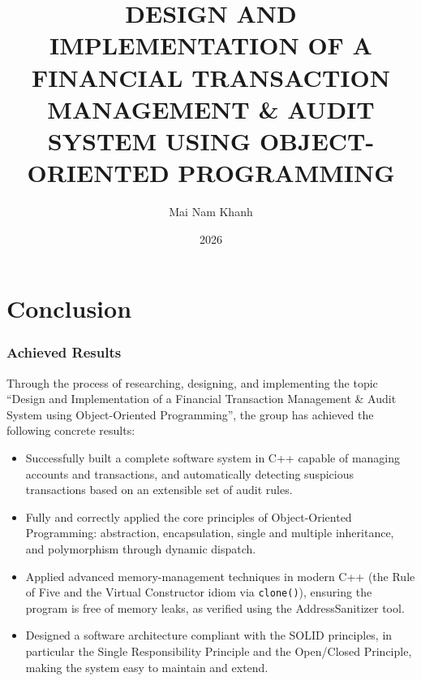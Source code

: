 \documentclass[12pt, oneside]{report}
\title{DESIGN AND IMPLEMENTATION OF A FINANCIAL TRANSACTION MANAGEMENT \& AUDIT SYSTEM USING OBJECT-ORIENTED PROGRAMMING}
\author{Mai Nam Khanh}
\date{2026}
\renewcommand{\figurename}{Figure}
\renewcommand{\tablename}{Table}
\renewcommand{\chaptername}{Chapter}
\begin{document}
\renewcommand{\figurename}{Figure}
\renewcommand{\tablename}{Table}
\renewcommand{\chaptername}{Chapter}

\maketitle
\makesubtitle




\renewcommand{\contentsname}{Table of Contents}
\tableofcontents



\renewcommand{\listtablename}{List of Tables}
\renewcommand{\listfigurename}{List of Figures}
\listoftables
\listoffigures
\lstlistoflistings

\newpage
\pagestyle{fancy}
\cfoot{\fontsize{13pt}{18pt} \selectfont \thepage}


\newpage
\pagestyle{fancy}
\rhead{\fontsize{10pt}{18pt} \selectfont \nouppercase{\leftmark}}
\cfoot{\fontsize{13pt}{18pt} \selectfont \thepage}





\chapter*{Conclusion}
\subsection*{Achieved Results}
Through the process of researching, designing, and implementing the topic ``Design and Implementation of a Financial Transaction Management \& Audit System using Object-Oriented Programming'', the group has achieved the following concrete results:

\begin{itemize}
    \item Successfully built a complete software system in C++ capable of managing accounts and transactions, and automatically detecting suspicious transactions based on an extensible set of audit rules.
    \item Fully and correctly applied the core principles of Object-Oriented Programming: abstraction, encapsulation, single and multiple inheritance, and polymorphism through dynamic dispatch.
    \item Applied advanced memory-management techniques in modern C++ (the Rule of Five and the Virtual Constructor idiom via \texttt{clone()}), ensuring the program is free of memory leaks, as verified using the AddressSanitizer tool.
    \item Designed a software architecture compliant with the SOLID principles, in particular the Single Responsibility Principle and the Open/Closed Principle, making the system easy to maintain and extend.
\end{itemize}
\end{document}

